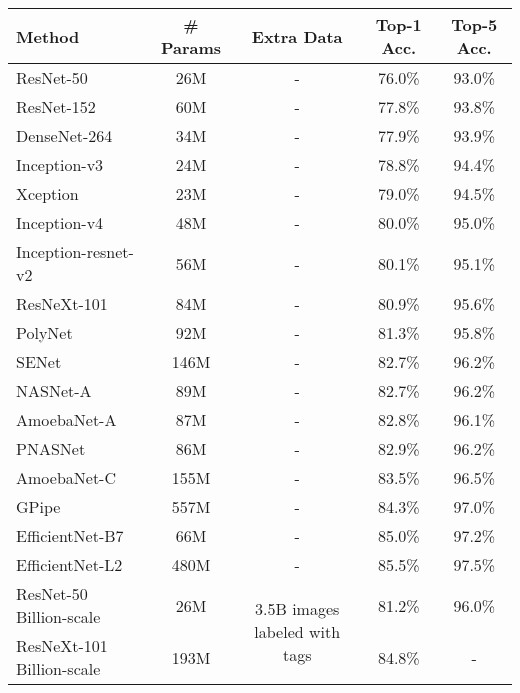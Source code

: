 \documentclass[10pt,twocolumn,letterpaper]{article}
\begin{document}
\begin{table*}[h!]
\small
    \centering      
        \begin{tabular}{l|cc|cc}                                                
        \toprule 
        Method & \# Params & Extra Data  &  Top-1 Acc. & Top-5 Acc.   \\
        \midrule       
        ResNet-50 \cite{he2016deep} & 26M & -  & 76.0\% & 93.0\%   \\
        ResNet-152 \cite{he2016deep} & 60M  & - &  77.8\% & 93.8\% \\
        DenseNet-264 \cite{huang2017densely} & 34M & - & 77.9\% & 93.9\%   \\
        Inception-v3 \cite{szegedy2016rethinking}& 24M  & - & 78.8\% & 94.4\%  \\
        Xception \cite{chollet2017xception} & 23M & - & 79.0\%   & 94.5\%  \\
        Inception-v4 \cite{szegedy2017inception} & 48M  & - & 80.0\% & 95.0\%  \\  
        Inception-resnet-v2  \cite{szegedy2017inception} & 56M & - & 80.1\% & 95.1\% \\  
		ResNeXt-101 \cite{xie2017aggregated}  & 84M   & - & 80.9\% & 95.6\% \\
		PolyNet \cite{zhang2017polynet}  & 92M  & - & 81.3\%  & 95.8\% \\
		SENet \cite{hu2018squeeze} & 146M & - & 82.7\% & 96.2\%   \\
		 NASNet-A \cite{zoph2018learning} & 89M & - & 82.7\% & 96.2\%   \\
		 AmoebaNet-A \cite{real2019regularized} & 87M & - & 82.8\% & 96.1\%   \\
		 PNASNet \cite{liu2018progressive} & 86M  & - & 82.9\% & 96.2\%  \\
		 AmoebaNet-C  \cite{cubuk2018autoaugment}  & 155M  & - &  83.5\%  & 96.5\% \\
		GPipe \cite{gpipe18} & 557M & - & 84.3\%  & 97.0\%   \\
		 EfficientNet-B7 \cite{tan2019efficientnet} &  66M  & - & 85.0\% & 97.2\%   \\
		 EfficientNet-L2 \cite{tan2019efficientnet} &  480M  & - & 85.5\% & 97.5\%   \\
        \midrule
        ResNet-50 Billion-scale \cite{billion_large_scale} & 26M & \multirow{4}{*}{3.5B images labeled with tags} & 81.2\% & 96.0\% \\
        ResNeXt-101 Billion-scale \cite{billion_large_scale} & 193M &  & 84.8\% & - \\

\end{tabular}
\end{table*}
\end{document}

